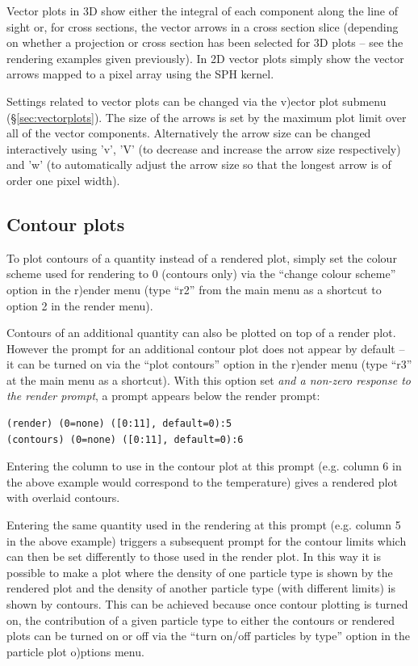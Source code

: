 \documentclass[a4paper,10pt]{article}
\begin{document}
Vector plots in 3D show either the integral of each component along the line of sight or, for cross sections, the vector arrows in a cross section slice (depending on whether a projection or cross section has been selected for 3D plots -- see the rendering examples given previously). In 2D vector plots simply show the vector arrows mapped to a pixel array using the SPH kernel.

 Settings related to vector plots can be changed via the v)ector plot submenu (\S\ref{sec:vectorplots}). The size of the arrows is set by the maximum plot limit over all of the vector components. Alternatively the arrow size can be changed interactively using 'v', 'V' (to decrease and increase the arrow size respectively) and 'w' (to automatically adjust the arrow size so that the longest arrow is of order one pixel width). 

\subsection{Contour plots}
 To plot contours of a quantity instead of a rendered plot, simply set the colour scheme used for rendering to 0 (contours only) via the ``change colour scheme'' option in the r)ender menu (type ``r2'' from the main menu as a shortcut to option 2 in the render menu).

  Contours of an additional quantity can also be plotted on top of a render plot. However the prompt for an additional contour plot does not appear by default -- it can be turned on via the ``plot contours'' option in the r)ender menu (type ``r3'' at the main menu as a shortcut). With this option set \emph{and a non-zero response to the render prompt}, a prompt appears below the render prompt:
\begin{verbatim}
(render) (0=none) ([0:11], default=0):5
(contours) (0=none) ([0:11], default=0):6
\end{verbatim}
 Entering the column to use in the contour plot at this prompt (e.g. column 6 in the above example would correspond to the temperature) gives a rendered plot with overlaid contours.

Entering the same quantity used in the rendering at this prompt (e.g. column 5 in the above example) triggers a subsequent prompt for the contour limits which can then be set differently to those used in the render plot. In this way it is possible to make a plot where the density of one particle type is shown by the rendered plot and the density of another particle type (with different limits) is shown by contours. This can be achieved because once contour plotting is turned on, the contribution of a given particle type to either the contours or rendered plots can be turned on or off via the ``turn on/off particles by type'' option in the particle plot o)ptions menu.
\end{document}
